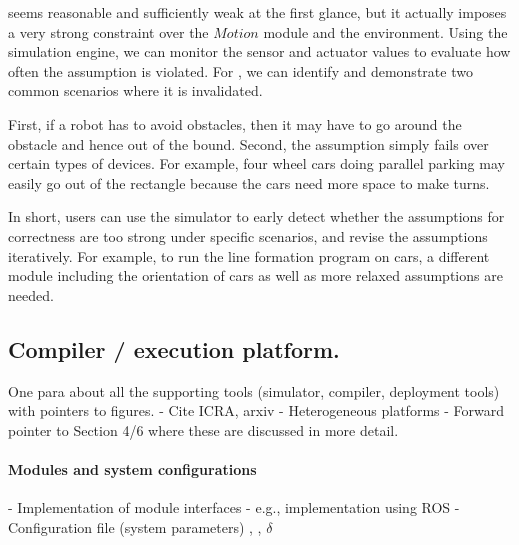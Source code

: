  seems reasonable and sufficiently weak at the first glance,
but it actually imposes a very strong constraint over the $Motion$ module and the environment.
Using the simulation engine, we can monitor the sensor and actuator values to evaluate how often the assumption is violated.
For , we can identify and demonstrate two common scenarios
where it is invalidated.


First, if a robot has to avoid obstacles,
then it may have to go around the obstacle and hence out of the bound.
Second, the assumption simply fails over certain types of devices.
For example, four wheel cars doing parallel parking may easily go out of the rectangle
because the cars need more space to make turns.

In short, users can use the simulator to early detect whether
the assumptions for correctness are too strong under specific scenarios,
and revise the assumptions iteratively.
For example, to run the line formation program on cars,
a different module including the orientation of cars as well as more relaxed assumptions are needed.

\subsection{Compiler / execution platform.}
One para about all the supporting tools (simulator, compiler, deployment tools) with pointers to figures.
- Cite ICRA, arxiv
- Heterogeneous platforms
- Forward pointer to Section 4/6 where these are discussed in more detail.

\paragraph{Modules and system configurations}

- Implementation of module interfaces
- e.g., implementation using ROS
- Configuration file (system parameters) \myuin, \NMAX, $\delta$
